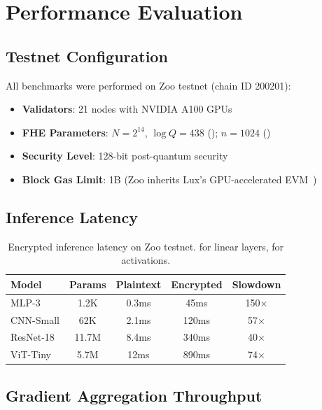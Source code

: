 \section{Performance Evaluation}

\label{sec:evaluation}

\subsection{Testnet Configuration}

All benchmarks were performed on Zoo testnet (chain ID 200201):

\begin{itemize}
    \item \textbf{Validators}: 21 nodes with NVIDIA A100 GPUs
    \item \textbf{FHE Parameters}: $N = 2^{14}$, $\log Q = 438$ (\CKKS{}); $n = 1024$ (\TFHE{})
    \item \textbf{Security Level}: 128-bit post-quantum security
    \item \textbf{Block Gas Limit}: 1B (Zoo inherits Lux's GPU-accelerated EVM~\cite{lux-evmgpu-benchmark})
\end{itemize}

\subsection{Inference Latency}

\begin{table}[t]
\centering
\begin{tabular}{lcccc}
\toprule
\textbf{Model} & \textbf{Params} & \textbf{Plaintext} & \textbf{Encrypted} & \textbf{Slowdown} \\
\midrule
MLP-3 & 1.2K & 0.3ms & 45ms & 150$\times$ \\
CNN-Small & 62K & 2.1ms & 120ms & 57$\times$ \\
ResNet-18 & 11.7M & 8.4ms & 340ms & 40$\times$ \\
ViT-Tiny & 5.7M & 12ms & 890ms & 74$\times$ \\
\bottomrule
\end{tabular}
\caption{Encrypted inference latency on Zoo testnet. \CKKS{} for linear layers, \TFHE{} for activations.}
\label{tab:inference}
\end{table}

\subsection{Gradient Aggregation Throughput}

